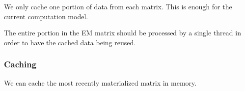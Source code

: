 We only cache one portion of data from each matrix. This is enough for the current
computation model.

The entire portion in the EM matrix should be processed by a single thread in order
to have the cached data being reused.

\subsubsection{Caching}

We can cache the most recently materialized matrix in memory.
